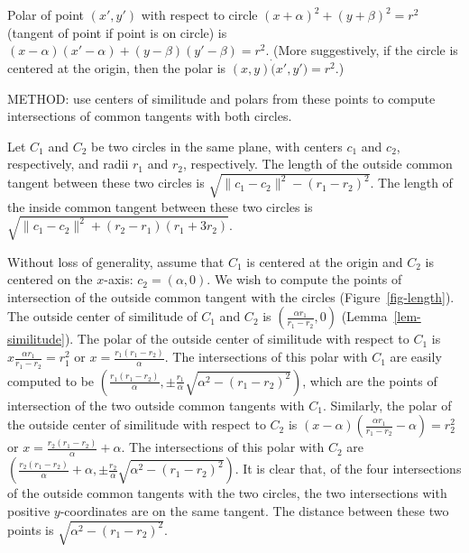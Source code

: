 \begin{lemma}
\label{lem-polar}
\cite[p. 82?, also see p. 103]{SalmonConic}
Polar of point $(x',y')$ with respect to circle 
$(x+\alpha)^{2} + (y+\beta)^{2} = r^{2}$
(tangent of point if point is on circle) 
is $(x-\alpha)(x'-\alpha) + (y-\beta)(y'-\beta) = r^{2}$.
(More suggestively, if the circle is centered at the origin,
then the polar is $(x,y) \dot (x',y') = r^{2}$.)
\end{lemma}

METHOD: use centers of similitude and polars from these points
to compute intersections of common tangents with both circles.

\begin{theorem}
Let $C_{1}$ and $C_{2}$ be two circles in the same plane,
with centers $c_{1}$ and $c_{2}$, respectively, and
radii $r_{1}$ and $r_{2}$, respectively.
The length of the outside common tangent between these two circles is 
$\sqrt{\|c_{1} - c_{2}\|^{2} - (r_{1} - r_{2})^{2}}$.
The length of the inside common tangent between these two circles is
$\sqrt{\|c_{1} - c_{2}\|^{2} + (r_{2} - r_{1})(r_{1} + 3r_{2})}$.
\end{theorem}
Without loss of generality, assume that $C_{1}$ is centered at the origin
and $C_{2}$ is centered on the $x$-axis: $c_{2} = (\alpha,0)$.
We wish to compute the points of intersection of the outside common tangent
with the circles (Figure~\ref{fig-length}).
The outside center of similitude of $C_{1}$ and $C_{2}$ is 
$(\frac{\alpha r_{1}}{r_{1} - r_{2}}, 0)$ (Lemma~\ref{lem-similitude}).
The polar of the outside center of similitude with respect to $C_{1}$ is 
$x \frac{\alpha r_{1}}{r_{1} - r_{2}} = r_{1}^{2}$
or $x = \frac{r_{1}(r_{1} - r_{2})}{\alpha}$.
The intersections of this polar with $C_{1}$ are easily computed to be
$(\frac{r_{1}(r_{1} - r_{2})}{\alpha}, 
  \pm \frac{r_{1}}{\alpha} \sqrt{\alpha^{2} - (r_{1} - r_{2})^{2}})$,
which are the points of intersection of the two outside common tangents 
with $C_{1}$.
Similarly, the polar of the outside center of similitude with respect 
to $C_{2}$ is 
$(x-\alpha)(\frac{\alpha r_{1}}{r_{1} - r_{2}} - \alpha) = r_{2}^{2}$
or $x = \frac{r_{2}(r_{1} - r_{2})}{\alpha} + \alpha$.
The intersections of this polar with $C_{2}$ are
$(\frac{r_{2}(r_{1} - r_{2})}{\alpha} + \alpha, 
  \pm \frac{r_{2}}{\alpha} \sqrt{\alpha^{2} - (r_{1} - r_{2})^{2}})$.
It is clear that, of the four intersections of the outside common tangents
with the two circles, 
the two intersections with positive $y$-coordinates are on the same tangent.
The distance between these two points is $\sqrt{\alpha^{2} - (r_{1} - r_{2})^{2}}$.

